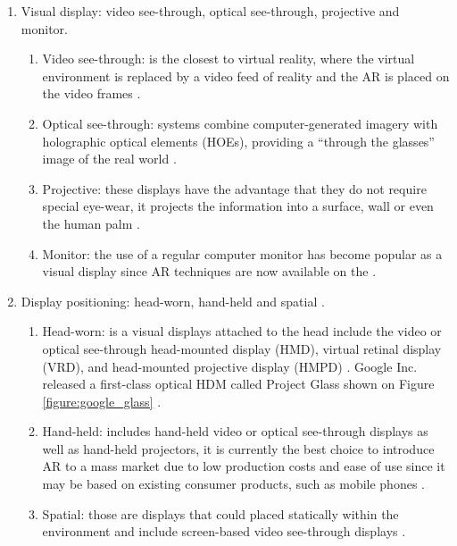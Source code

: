 \begin{enumerate}
  \item Visual display: video see-through, optical see-through, projective and monitor.
    \begin{enumerate}
      \item Video see-through: is the closest to virtual reality, where the virtual environment is replaced by a video feed of reality and the AR is placed on the video frames \cite{Benford1998}.
      \item Optical see-through: systems combine computer-generated imagery with holographic optical elements (HOEs), providing a ``through the glasses'' image of the real world \cite{Benford1998}.
      \item Projective: these displays have the advantage that they do not require special eye-wear, it projects the information into a surface, wall or even the human palm \cite{Benford1998}.
      \item Monitor: the use of a regular computer monitor has become popular as a visual display since AR techniques are now available on the \cite{Benford1998}.
    \end{enumerate}

  \item Display positioning: head-worn, hand-held and spatial \cite{Benford1998}.
    \begin{enumerate}
      \item Head-worn: is a visual displays attached to the head include the video or optical see-through head-mounted display (HMD), virtual retinal display (VRD), and head-mounted projective display (HMPD) \cite{Benford1998}. Google Inc. released a first-class optical HDM called Project Glass shown on Figure \ref{figure:google_glass} \cite{Glass2013}.
      \item Hand-held: includes hand-held video or optical see-through displays as well as hand-held projectors, it is currently the best choice to introduce AR to a mass market due to low production costs and ease of use since it may be based on existing consumer products, such as mobile phones \cite{Benford1998}.
      \item Spatial: those are displays that could placed statically within the environment and include screen-based video see-through displays \cite{Benford1998}.
    \end{enumerate}
\end{enumerate}


